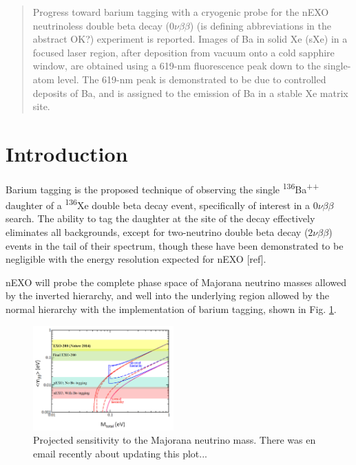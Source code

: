 \documentclass[aps,pra,reprint,superscriptaddress]{revtex4-1}
\begin{document}
\date{\today}

\begin{abstract}
Progress toward barium tagging with a cryogenic probe for the nEXO neutrinoless double beta decay ($0\nu\beta\beta$)  {\color{red}(is defining abbreviations in the abstract OK?)} experiment is reported.  Images of Ba in solid Xe (sXe) in a focused laser region, after deposition from vacuum onto a cold sapphire window, are obtained using a 619-nm fluorescence peak down to the single-atom level.  The 619-nm peak is demonstrated to be due to controlled deposits of Ba, and is assigned to the emission of Ba in a stable Xe matrix site.

\end{abstract}


\maketitle %


\section{Introduction}

Barium tagging is the proposed technique of observing the single \textsuperscript{136}Ba\textsuperscript{++} daughter of a \textsuperscript{136}Xe double beta decay event, specifically of interest in a $0\nu\beta\beta$ search.  The ability to tag the daughter at the site of the decay effectively eliminates all backgrounds, except for two-neutrino double beta decay ($2\nu\beta\beta$) events in the tail of their spectrum, though these have been demonstrated to be negligible with the energy resolution expected for nEXO [ref]. 

nEXO will probe the complete phase space of Majorana neutrino masses allowed by the inverted hierarchy, and well into the underlying region allowed by the normal hierarchy with the implementation of barium tagging, shown in Fig. \ref{fig:nEXOsensitivity}.  

\begin{figure}
\includegraphics[width=0.48\textwidth]{figures/sensitivity.png}
\caption{Projected sensitivity to the Majorana neutrino mass.  {\color{red}There was en email recently about updating this plot...}}
\label{fig:nEXOsensitivity}
\end{figure}
\end{document}
